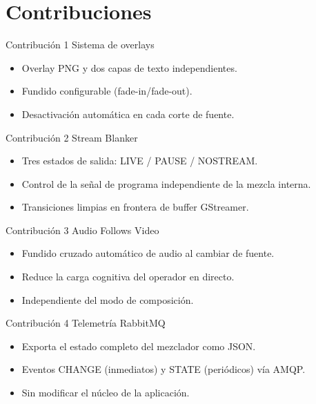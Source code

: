 \documentclass[aspectratio=169,10pt]{beamer}
\begin{document}
\section{Contribuciones}

\begin{frame}{Contribuci\'on 1 \textemdash{} Sistema de overlays}
  \begin{itemize}
    \item Overlay PNG y dos capas de texto independientes.
    \item Fundido configurable (fade-in/fade-out).
    \item Desactivaci\'on autom\'atica en cada corte de fuente.
  \end{itemize}
\end{frame}

\begin{frame}{Contribuci\'on 2 \textemdash{} Stream Blanker}
  \begin{itemize}
    \item Tres estados de salida: LIVE / PAUSE / NOSTREAM.
    \item Control de la se\~nal de programa independiente de la mezcla interna.
    \item Transiciones limpias en frontera de buffer GStreamer.
  \end{itemize}
\end{frame}

\begin{frame}{Contribuci\'on 3 \textemdash{} Audio Follows Video}
  \begin{itemize}
    \item Fundido cruzado autom\'atico de audio al cambiar de fuente.
    \item Reduce la carga cognitiva del operador en directo.
    \item Independiente del modo de composici\'on.
  \end{itemize}
\end{frame}

\begin{frame}{Contribuci\'on 4 \textemdash{} Telemetr\'ia RabbitMQ}
  \begin{itemize}
    \item Exporta el estado completo del mezclador como JSON.
    \item Eventos CHANGE (inmediatos) y STATE (peri\'odicos) v\'ia AMQP.
    \item Sin modificar el n\'ucleo de la aplicaci\'on.
  \end{itemize}
\end{frame}
\end{document}
